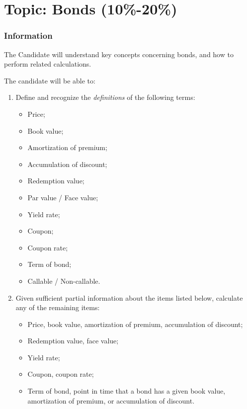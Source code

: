 \chapter[Topic: Bonds]{Topic: Bonds (10\%-20\%)}

\subsection{Information}

\begin{distributions}[Objective]
The Candidate will understand key concepts concerning bonds, and how to perform related calculations.
\end{distributions}

\begin{outcomes}
The candidate will be able to:
\begin{enumerate}[label = \alph*), leftmargin = *]
	\item	Define and recognize the \textit{definitions} of the following terms:
		\begin{itemize}[leftmargin = *]
		\item	Price;
		\item	Book value;
		\item	Amortization of premium;
		\item	Accumulation of discount;
		\item	Redemption value;
		\item	Par value / Face value;
		\item	Yield rate;
		\item	Coupon;
		\item	Coupon rate;
		\item	Term of bond;
		\item	Callable / Non-callable.
		\end{itemize}
	\item	Given sufficient partial information about the items listed below, calculate any of the remaining items:
		\begin{itemize}[leftmargin = *]
		\item	Price, book value, amortization of premium, accumulation of discount;
		\item	Redemption value, face value;
		\item	Yield rate;
		\item	Coupon, coupon rate;
		\item	Term of bond, point in time that a bond has a given book value, amortization of premium, or accumulation of discount.
		\end{itemize}
\end{enumerate}
\end{outcomes}

